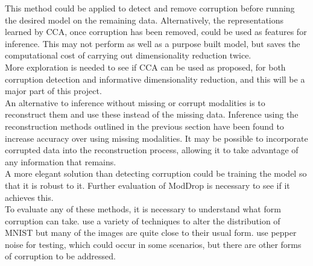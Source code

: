This method could be applied to detect and remove corruption before running the desired model on the remaining data. Alternatively, the representations learned by CCA, once corruption has been removed, could be used as features for inference. This may not perform as well as a purpose built model, but saves the computational cost of carrying out dimensionality reduction twice.\\

More exploration is needed to see if CCA can be used as proposed, for both corruption detection and informative dimensionality reduction, and this will be a major part of this project.\\

An alternative to inference without missing or corrupt modalities is to reconstruct them and use these instead of the missing data. Inference using the reconstruction methods outlined in the previous section have been found to increase accuracy over using missing modalities. It may be possible to incorporate corrupted data into the reconstruction process, allowing it to take advantage of any information that remains.\\

A more elegant solution than detecting corruption could be training the model so that it is robust to it. Further evaluation of ModDrop is necessary to see if it achieves this.\\

To evaluate any of these methods, it is necessary to understand what form corruption can take. \cite{failingloudly} use a variety of techniques to alter the distribution of MNIST but many of the images are quite close to their usual form. \cite{ModDrop} use pepper noise for testing, which could occur in some scenarios, but there are other forms of corruption to be addressed.
